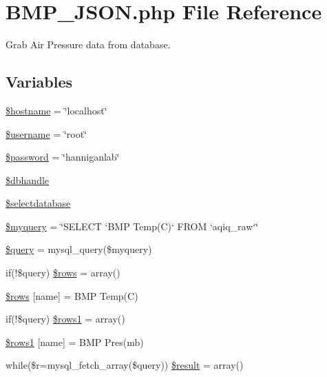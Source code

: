 \hypertarget{_b_m_p___j_s_o_n_8php}{}\section{B\+M\+P\+\_\+\+J\+S\+O\+N.\+php File Reference}
\label{_b_m_p___j_s_o_n_8php}


Grab Air Pressure data from database.  


\subsection*{Variables}
\begin{DoxyCompactItemize}
\item 
\hyperlink{_b_m_p___j_s_o_n_8php_a8bf9ffb42ed554b203b55377d1fc9aa4}{\$hostname} = \char`\"{}localhost\char`\"{}
\item 
\hyperlink{_b_m_p___j_s_o_n_8php_a0eb82aa5f81cf845de4b36cd653c42cf}{\$username} = \char`\"{}root\char`\"{}
\item 
\hyperlink{_b_m_p___j_s_o_n_8php_a607686ef9f99ea7c42f4f3dd3dbb2b0d}{\$password} = \char`\"{}hanniganlab\char`\"{}
\item 
\hyperlink{_b_m_p___j_s_o_n_8php_a013f690a9cf598d1498e72aa8aa8a8d2}{\$dbhandle}
\item 
\hyperlink{_b_m_p___j_s_o_n_8php_a3a00cb9dd022e8ab0cdfe17aad984a14}{\$selectdatabase}
\item 
\hyperlink{_b_m_p___j_s_o_n_8php_ac5c30f6dfc50952f15ca50a2a3d1a3c8}{\$myquery} = \char`\"{}S\+E\+L\+E\+CT `B\+MP Temp(C)` F\+R\+OM `aqiq\+\_\+raw`\char`\"{}
\item 
\hyperlink{_b_m_p___j_s_o_n_8php_af59a5f7cd609e592c41dc3643efd3c98}{\$query} = mysql\+\_\+query(\$myquery)
\item 
if(!\$query) \hyperlink{_b_m_p___j_s_o_n_8php_a9d560e904e6665a6ee21f86a65c1ef8e}{\$rows} = array()
\item 
\hyperlink{_b_m_p___j_s_o_n_8php_a6384d385f2f9c3f6bcad27ed87e67106}{\$rows} \mbox{[}\textquotesingle{}name\textquotesingle{}\mbox{]} = \textquotesingle{}B\+MP Temp(C)\textquotesingle{}
\item 
if(!\$query) \hyperlink{_b_m_p___j_s_o_n_8php_a15da33e0f4006a60bff01708cb5d1428}{\$rows1} = array()
\item 
\hyperlink{_b_m_p___j_s_o_n_8php_aece741d5099bb229e07df7a57776cfaa}{\$rows1} \mbox{[}\textquotesingle{}name\textquotesingle{}\mbox{]} = \textquotesingle{}B\+MP Pres(mb)\textquotesingle{}
\item 
while(\$r=mysql\+\_\+fetch\+\_\+array(\$query)) \hyperlink{_b_m_p___j_s_o_n_8php_a9148136d1e11f768be4f805d7e567da2}{\$result} = array()
\end{DoxyCompactItemize}


